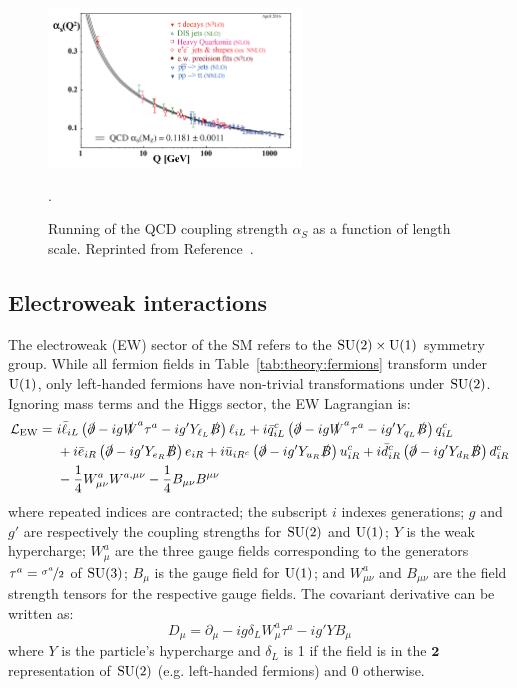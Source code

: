 \begin{figure}[]
\begin{center}
    \includegraphics[width=0.6\textwidth]{figures/theory/alphas.png}
    \caption{Running of the QCD coupling strength $\alpha_S$ as a function of length scale.
             Reprinted from Reference~\cite{pdg}.}
    \label{fig:theory:alphas}.
\end{center}
\end{figure}

\subsection{Electroweak interactions}
\label{sec:theory:ew}
The electroweak (EW) sector of the SM refers to the $\operatorname{\mathrm{SU}}(2)\times\operatorname{\mathrm{U}}(1)$ symmetry group.
While all fermion fields in Table~\ref{tab:theory:fermions} transform under $\operatorname{\mathrm{U}}(1)$, only left-handed fermions have non-trivial transformations under $\operatorname{\mathrm{SU}}(2)$.
Ignoring mass terms and the Higgs sector, the EW Lagrangian is:
\begin{align}
\mathcal{L}_\mathrm{EW} =~
        & i\bar\ell_{iL} \left(\slashed\partial-ig \slashed W^a \tau^a - ig'Y_{\ell_L} \slashed B\right)\ell_{iL} 
      + i\bar q_{iL}^{c} \left(\slashed\partial-ig \slashed W^a \tau^a - ig'Y_{q_L} \slashed B\right)q_{iL}^{c} \nonumber \\
      & + i\bar e_{iR} \left(\slashed\partial-ig'Y_{ e_R}\slashed B\right) e_{iR} 
       + i\bar u_{iR^{c}} \left(\slashed\partial-ig'Y_{u_R}\slashed B\right) u_{iR}^{c} 
       + i\bar d_{iR}^{c} \left(\slashed\partial-ig'Y_{d_R}\slashed B\right) d_{iR}^{c} \nonumber \\ 
      & - \frac{1}{4} W_{\mu\nu}^a W^{a,\mu\nu} - \frac{1}{4} B_{\mu\nu} B^{\mu\nu}  
      \label{eq:theory:lew}
\end{align}
where repeated indices are contracted; the subscript $i$ indexes generations; $g$ and $g'$ are respectively the coupling strengths for $\operatorname{\mathrm{SU}}(2)$ and $\operatorname{\mathrm{U}}(1)$; $Y$ is the weak hypercharge; $W_\mu^a$ are the three gauge fields corresponding to the generators $\tau^a = \nicefrac{\sigma^a}{2}$ of $\operatorname{\mathrm{SU}}(3)$; $B_\mu$ is the gauge field for $\operatorname{\mathrm{U}}(1)$; and $W_{\mu\nu}^a$ and $B_{\mu\nu}$ are the field strength tensors for the respective gauge fields.
The covariant derivative can be written as:
\begin{equation}
    D_\mu = \partial_\mu - ig\delta_L W^a_\mu \tau^a - ig' YB_\mu
\end{equation}
where $Y$ is the particle's hypercharge and $\delta_L$ is 1 if the field is in the $\mathbf{2}$ representation of $\operatorname{\mathrm{SU}}(2)$ (e.g. left-handed fermions) and 0 otherwise. 

